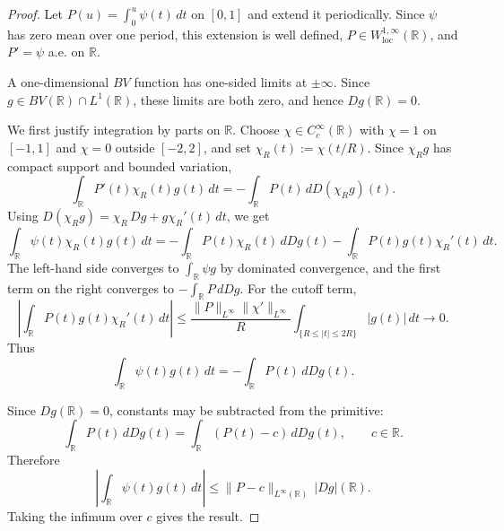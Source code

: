 \documentclass[11pt,letterpaper]{article}
\theoremstyle{definition}
\theoremstyle{remark}
\begin{document}
\begin{proof}
Let $P(u)=\int_0^u\psi(t)\,dt$ on $[0,1]$ and extend it periodically. Since
$\psi$ has zero mean over one period, this extension is well defined,
$P\in W^{1,\infty}_{\mathrm{loc}}(\mathbb R)$, and $P'=\psi$ a.e. on
$\mathbb R$.

A one-dimensional $BV$ function has one-sided limits at $\pm\infty$. Since
$g\in BV(\mathbb R)\cap L^1(\mathbb R)$, these limits are both zero, and hence
$Dg(\mathbb R)=0$.

We first justify integration by parts on $\mathbb R$. Choose
$\chi\in C_c^\infty(\mathbb R)$ with $\chi=1$ on $[-1,1]$ and $\chi=0$ outside
$[-2,2]$, and set $\chi_R(t):=\chi(t/R)$. Since $\chi_Rg$ has compact support
and bounded variation,
$$
\int_{\mathbb R}P'(t)\chi_R(t)g(t)\,dt
=
-\int_{\mathbb R}P(t)\,dD(\chi_Rg)(t).
$$
Using $D(\chi_Rg)=\chi_R\,Dg+g\chi_R'(t)\,dt$, we get
$$
\int_{\mathbb R}\psi(t)\chi_R(t)g(t)\,dt
=
-\int_{\mathbb R}P(t)\chi_R(t)\,dDg(t)
-
\int_{\mathbb R}P(t)g(t)\chi_R'(t)\,dt.
$$
The left-hand side converges to $\int_{\mathbb R}\psi g$ by dominated
convergence, and the first term on the right converges to
$-\int_{\mathbb R}P\,dDg$. For the cutoff term,
$$
\left|
\int_{\mathbb R}P(t)g(t)\chi_R'(t)\,dt
\right|
\le
\frac{\|P\|_{L^\infty}\|\chi'\|_{L^\infty}}{R}
\int_{\{R\le |t|\le 2R\}} |g(t)|\,dt
\to0.
$$
Thus
\begin{equation}
\label{eq:periodic_ibp_identity}
\int_{\mathbb R}\psi(t)g(t)\,dt
=
-\int_{\mathbb R}P(t)\,dDg(t).
\end{equation}

Since $Dg(\mathbb R)=0$, constants may be subtracted from the primitive:
$$
\int_{\mathbb R}P(t)\,dDg(t)
=
\int_{\mathbb R}(P(t)-c)\,dDg(t),
\qquad c\in\mathbb R.
$$
Therefore
$$
\left|
\int_{\mathbb R}\psi(t)g(t)\,dt
\right|
\le
\|P-c\|_{L^\infty(\mathbb R)}\,|Dg|(\mathbb R).
$$
Taking the infimum over $c$ gives the result.
\end{proof}
\end{document}
